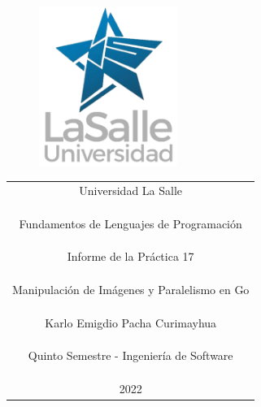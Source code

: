 \documentclass[https://www.overleaf.com/project/63761df255a8a9f4a15c3579
	letterpaper, %
	10pt, %
]{CSUniSchoolLabReport}
\begin{document}
\begin{figure}[H] %
	\centering %
	\includegraphics[width=0.4\textwidth]{images/logo.png} %
\end{figure}

\begin{center}
    \begin{tabular} {c}
        \Huge Universidad La Salle \\\\\\\\
        \huge Fundamentos de Lenguajes de Programación \\\\\\\\
        \LARGE Informe de la Práctica 17 \\\\\\\\
        \huge Manipulación de Imágenes y Paralelismo en Go \\\\\\\\
        \LARGE Karlo Emigdio Pacha Curimayhua \\\\\\\\
        \LARGE Quinto Semestre - Ingeniería de Software \\\\\\\\
        \LARGE 2022
      \end{tabular}
\end{center}

\begin{center}
	\begin{tabular}{l r}
	\end{tabular}
\end{center}
\end{document}
